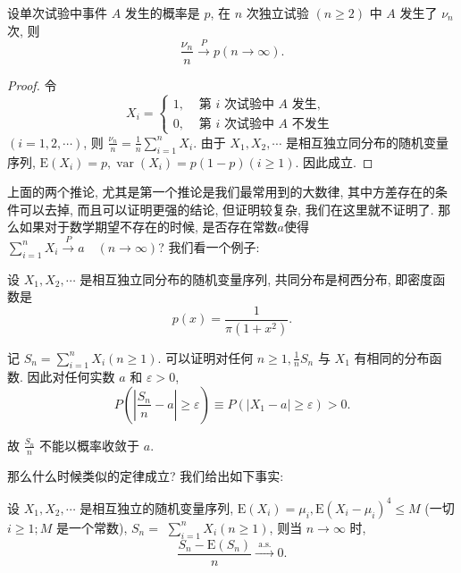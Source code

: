 \begin{corollary}
    设单次试验中事件 $A$ 发生的概率是 $p$, 在 $n$ 次独立试验 $(n \geqslant 2)$ 中 $A$ 发生了 $\nu_n$ 次, 则
$$
\frac{\nu_n}{n} \stackrel{P}{\longrightarrow} p(n \rightarrow \infty) .
$$
\end{corollary}

\begin{proof}令
$$
X_i= \begin{cases}1, & \text { 第 } i \text { 次试验中 } A \text { 发生, } \\ 0, & \text { 第 } i \text { 次试验中 } A \text { 不发生 }\end{cases}
$$
$(i=1,2, \cdots)$, 则 $\frac{\nu_n}{n}=\frac{1}{n} \sum_{i=1}^n X_i$. 由于 $X_1, X_2, \cdots$ 是相互独立同分布的随机变量序列, $\mathrm{E}\left(X_i\right)=p, \operatorname{var}\left(X_i\right)=p(1-p)(i \geqslant 1)$. 因此成立.
\end{proof}

上面的两个推论, 尤其是第一个推论是我们最常用到的大数律, 其中方差存在的条件可以去掉, 而且可以证明更强的结论, 但证明较复杂, 我们在这里就不证明了. 那么如果对于数学期望不存在的时候, 是否存在常数$a$使得$\sum_{i=1}^n X_i \stackrel{P}{\longrightarrow} a \quad(n \rightarrow \infty)$? 我们看一个例子: 

\begin{example}
    设 $X_1, X_2, \cdots$ 是相互独立同分布的随机变量序列, 共同分布是柯西分布, 即密度函数是
$$
p(x)=\frac{1}{\pi\left(1+x^2\right)} .
$$

记 $S_n=\sum_{i=1}^n X_i(n \geqslant 1)$. 可以证明对任何 $n \geqslant 1, \frac{1}{n} S_n$ 与 $X_1$ 有相同的分布函数. 因此对任何实数 $a$ 和 $\varepsilon>0$,
$$
P\left(\left|\frac{S_n}{n}-a\right| \geqslant \varepsilon\right) \equiv P\left(\left|X_1-a\right| \geqslant \varepsilon\right)>0 .
$$

故 $\frac{S_n}{n}$ 不能以概率收敛于 $a$.
\end{example}

那么什么时候类似的定律成立? 我们给出如下事实: 

\begin{theorem}
      设 $X_1, X_2, \cdots$ 是相互独立的随机变量序列, $\mathrm{E}\left(X_i\right)=\mu_i, \mathrm{E}\left(X_i-\mu_i\right)^4 \leqslant M$ (一切 $i \geqslant 1 ; M$ 是一个常数), $S_n=$ $\sum_{i=1}^n X_i(n \geqslant 1)$, 则当 $n \rightarrow \infty$ 时,
$$
\frac{S_n-\mathrm{E}\left(S_n\right)}{n} \stackrel{\text { a.s. }}{\longrightarrow} 0 .
$$
\end{theorem}

